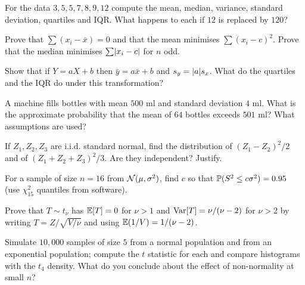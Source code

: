 \begin{exercise}
For the data $3,5,5,7,8,9,12$ compute the mean, median, variance, standard deviation, quartiles and IQR. What happens to each if $12$ is replaced by $120$?
\end{exercise}

\begin{exercise}
Prove that $\sum(x_i-\bar{x})=0$ and that the mean minimises $\sum(x_i-c)^2$. Prove that the median minimises $\sum\lvert x_i-c\rvert$ for $n$ odd.
\end{exercise}

\begin{exercise}
Show that if $Y=aX+b$ then $\bar{y}=a\bar{x}+b$ and $s_y=\lvert a\rvert s_x$. What do the quartiles and the IQR do under this transformation?
\end{exercise}

\begin{exercise}
A machine fills bottles with mean $500$ ml and standard deviation $4$ ml. What is the approximate probability that the mean of $64$ bottles exceeds $501$ ml? What assumptions are used?
\end{exercise}

\begin{exercise}
If $Z_1,Z_2,Z_3$ are i.i.d. standard normal, find the distribution of $(Z_1-Z_2)^2/2$ and of $(Z_1+Z_2+Z_3)^2/3$. Are they independent? Justify.
\end{exercise}

\begin{exercise}
For a sample of size $n=16$ from $\mathcal{N}(\mu,\sigma^2)$, find $c$ so that $\mathbb{P}(S^2\le c\sigma^2)=0.95$ (use $\chi^2_{15}$ quantiles from software).
\end{exercise}

\begin{exercise}
Prove that $T\sim t_\nu$ has $\mathbb{E}[T]=0$ for $\nu>1$ and $\operatorname{Var}[T]=\nu/(\nu-2)$ for $\nu>2$ by writing $T=Z/\sqrt{V/\nu}$ and using $\mathbb{E}(1/V)=1/(\nu-2)$.
\end{exercise}

\begin{exercise}
Simulate $10{,}000$ samples of size $5$ from a normal population and from an exponential population; compute the $t$ statistic for each and compare histograms with the $t_4$ density. What do you conclude about the effect of non-normality at small $n$?
\end{exercise}
